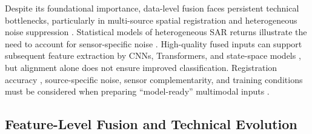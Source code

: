 \documentclass[]{interact}
\theoremstyle{plain}%
\theoremstyle{definition}
\theoremstyle{remark}
\DeclareRobustCommand{\DIFadd}[1]{{\protect\color{DIFaddcolor}\uwave{#1}}}
\DeclareRobustCommand{\DIFdel}[1]{{\protect\color{DIFdelcolor}\sout{#1}}}
\def\DIFadd#1{#1}%
\def\DIFdel#1{}%
\begin{document}
Despite its foundational importance, \DIFdel{data} \DIFadd{data-level} fusion faces persistent technical bottlenecks, particularly in multi-source spatial registration and heterogeneous noise suppression \citep{41}. \DIFdel{Our} \DIFdel{analysis} \DIFdel{suggests} \DIFdel{a} \DIFdel{paradigm} \DIFdel{shift} \DIFdel{in} \DIFadd{Statistical} \DIFadd{models} \DIFadd{of} \DIFadd{heterogeneous} \DIFadd{SAR} \DIFadd{returns} \DIFadd{illustrate} the \DIFdel{role} \DIFdel{of} \DIFdel{data} \DIFdel{fusion}\DIFdel{:} \DIFdel{it} \DIFdel{is} \DIFdel{no} \DIFdel{longer} \DIFdel{merely} \DIFdel{an} \DIFdel{end-to-end} \DIFdel{alignment} \DIFdel{task} \DIFdel{but} \DIFdel{has} \DIFdel{become} \DIFdel{an} \DIFdel{indispensable} \DIFdel{precursor} \DIFadd{need} \DIFadd{to} \DIFadd{account} for \DIFdel{advanced} \DIFdel{feature-level} \DIFdel{modeling} \DIFadd{sensor-specific} \DIFadd{noise} {\color{blue}\citep{58}}. High-quality fused inputs \DIFdel{are} \DIFdel{now} \DIFdel{critical} \DIFdel{for} \DIFdel{empowering} \DIFdel{deep} \DIFdel{learning} \DIFdel{architectures} \DIFdel{ranging} \DIFdel{from} \DIFdel{local} \DIFadd{can} \DIFadd{support} \DIFadd{subsequent} feature \DIFdel{oriented} \DIFdel{CNN} \DIFdel{to} \DIFdel{global} \DIFdel{context} \DIFdel{aware} \DIFdel{Transformer} \DIFadd{extraction} \DIFadd{by} \DIFadd{CNNs}\DIFadd{,} \DIFadd{Transformers}\DIFadd{,} and \DIFdel{the} \DIFdel{more} \DIFdel{recent} \DIFdel{linear} \DIFdel{complexity} \DIFdel{Mamba} \DIFadd{state-space} models \DIFdel{to} \DIFdel{achieve} \DIFdel{superior}\DIFadd{,} \DIFadd{but} \DIFadd{alignment} \DIFadd{alone} \DIFadd{does} \DIFadd{not} \DIFadd{ensure} \DIFadd{improved} \DIFadd{classification}\DIFadd{.} \DIFadd{Registration} accuracy \DIFdel{in} \DIFdel{complex} \DIFdel{LULC} \DIFdel{classification}\DIFadd{,} \DIFadd{source-specific} \DIFadd{noise}\DIFadd{,} \DIFadd{sensor} \DIFadd{complementarity}\DIFadd{,} and \DIFdel{simulation} \DIFdel{tasks}\DIFdel{.} \DIFdel{Consequently}\DIFdel{,} \DIFdel{the} \DIFdel{innovation} \DIFdel{in} \DIFdel{this} \DIFdel{domain} \DIFdel{is} \DIFdel{increasingly} \DIFdel{directed} \DIFdel{toward} \DIFdel{providing} \DIFadd{training} \DIFadd{conditions} \DIFadd{must} \DIFadd{be} \DIFadd{considered} \DIFadd{when} \DIFadd{preparing} ``model-ready'' multimodal inputs \DIFdel{that} \DIFdel{preserve} \DIFdel{both} \DIFdel{fine-grained} \DIFdel{textures} \DIFdel{and} \DIFdel{macro-scale} \DIFdel{spatial} \DIFdel{dependencies} \citep{23,cao2020urban}.


\clearpage
\subsection{Feature-Level Fusion and Technical Evolution}
\end{document}
